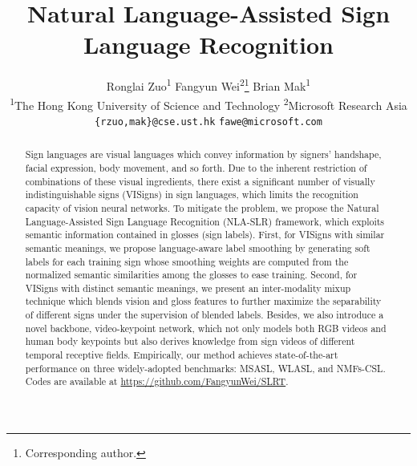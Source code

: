 \documentclass[10pt,twocolumn,letterpaper]{article}
\begin{document}
\title{Natural Language-Assisted Sign Language Recognition}

\author{
Ronglai Zuo\textsuperscript{\rm 1} \qquad Fangyun Wei\textsuperscript{\rm 2}\footnotemark[1]\thanks{Corresponding author.} \qquad Brian Mak\textsuperscript{\rm 1}\\
\textsuperscript{\rm 1}The Hong Kong University of Science and Technology \quad \textsuperscript{\rm 2}Microsoft Research Asia\\
\texttt{\small\{rzuo,mak\}@cse.ust.hk} \qquad
\texttt{\small fawe@microsoft.com} 
}
\maketitle

\begin{abstract}
Sign languages are visual languages which convey information by signers' handshape, facial expression, body movement, and so forth. Due to the inherent restriction of combinations of these visual ingredients, there exist a significant number of visually indistinguishable signs (VISigns) in sign languages, which limits the recognition capacity of vision neural networks.
To mitigate the problem, we propose the Natural Language-Assisted Sign Language Recognition (NLA-SLR) framework, which exploits semantic information contained in glosses (sign labels). First, for VISigns with similar semantic meanings, we propose language-aware label smoothing by generating soft labels for each training sign whose smoothing weights are computed from the normalized semantic similarities among the glosses to ease training. Second, for VISigns with distinct semantic meanings, we present an inter-modality mixup technique which blends vision and gloss features to further maximize the separability of different signs under the supervision of blended labels. Besides, we also introduce a novel backbone, video-keypoint network, which not only models both RGB videos and human body keypoints but also derives knowledge from sign videos of different temporal receptive fields. Empirically, our method achieves state-of-the-art performance on three widely-adopted benchmarks: MSASL, WLASL, and NMFs-CSL. Codes are available at \href{https://github.com/FangyunWei/SLRT}{https://github.com/FangyunWei/SLRT}.
\end{abstract} \vspace{-5mm}
\end{document}
